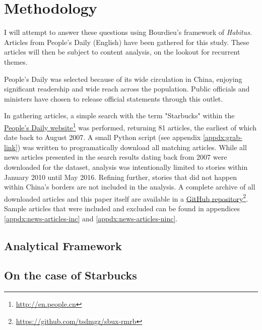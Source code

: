 \chapter{Methodology}\label{chap:methodology}

I will attempt to answer these questions using Bourdieu's framework of
\emph{Habitus}. Articles from People's Daily (English) have been gathered for
this study. These articles will then be subject to content analysis, on the
lookout for recurrent themes.

People's Daily was selected because of its wide circulation in China, enjoying
significant readership and wide reach across the population. Public officials
and ministers have chosen to release official statements through this outlet.

In gathering articles, a simple search with the term "Starbucks" within the
\href{http://en.people.cn}{People's Daily
website}\footnote{\url{http://en.people.cn}} was performed, returning 81
articles, the earliest of which date back to August 2007. A small Python script
(see appendix \autoref{appdx:grab-link}) was written to programatically download
all matching articles. While all news articles presented in the search results
dating back from 2007 were downloaded for the dataset, analysis was
intentionally limited to stories within January 2010 until May 2016. Refining
further, stories that did not happen within China's borders are not included in
the analysis. A complete archive of all downloaded articles and this paper
itself are available in a \href{https://github.com/tsdmgz/sbux-rmrb}{GitHub
repository}\footnote{\url{https://github.com/tsdmgz/sbux-rmrb}}. Sample articles
that were included and excluded can be found in appendices
\ref{appdx:news-articles-inc} and \ref{appdx:news-articles-ninc}.

\section{Analytical Framework}\label{sec:analyticf}


\section{On the case of Starbucks}\label{sec:case-of-sbux}

